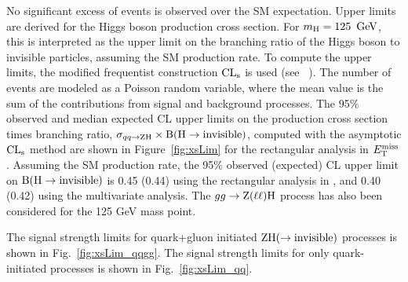 No significant excess of events is observed over the SM expectation.
Upper limits are derived for the Higgs boson production cross section.
For  $m_{\mathrm{H}} = 125~\,\text{Ge\hspace{-.08em}V}$, this is interpreted as the upper limit on the
branching ratio of the Higgs boson to invisible particles,
assuming the SM production rate. 
To compute the upper limits, the modified frequentist construction 
$\text{CL}_\text{s}$ is used (see ~\cite{Read1,junkcls,ATLAS:2011tau}).
The number of events are modeled as a Poisson random variable, 
where the mean value is the sum of the contributions from signal and background processes. 
The 95\% observed and median expected CL upper limits on the production cross section times branching ratio, 
$\sigma_{qq \to \mathrm{Z} \mathrm{H}} \times \mathrm{B}(\mathrm{H} \to {\rm invisible})$, computed with the asymptotic $\text{CL}_\text{s}$
method are shown in Figure~\ref{fig:xsLim} for the rectangular analysis in $E_\mathrm{T}^{\mathrm{miss}}$.
Assuming the SM production rate, the 95\% observed (expected) CL upper limit on $\mathrm{B}(\mathrm{H} \to {\rm invisible})$ is
0.45 (0.44) using the rectangular analysis in \met, and 0.40 (0.42) using the multivariate analysis. 
The $gg \to \mathrm{Z}(\ell\ell)\mathrm{H}$ process has also been considered for the 125 GeV mass point. 

The signal strength limits for quark+gluon initiated $\mathrm{Z}\mathrm{H}(\to{\rm invisible})$ processes is shown in Fig.~\ref{fig:xsLim_qqgg}.
The signal strength limits for only quark-initiated processes is shown in Fig.~\ref{fig:xsLim_qq}.




